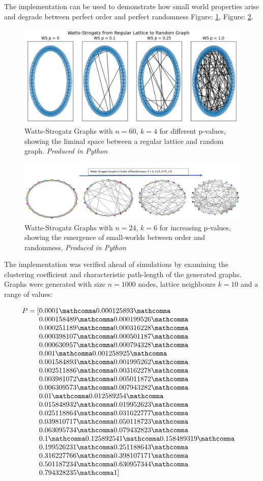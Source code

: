 \documentclass[
	a4paper, %
	10pt, %
	unnumberedsections, %
	twoside, %
]{LTJournalArticle}
\newcommand{\numberlist}[2][0.8\linewidth]{%
  [\parbox[t]{#1}{\printcommalist{#2}}%
}
\newcommand{\printcommalist}[1]{%
  \begingroup\lccode`~=`,\lowercase{\endgroup\def~}{\mathcomma\penalty0 }%
  \mathcode`,="8000
  \thinmuskip=6mu plus 6mu minus 2mu
  $#1]$
}
\begin{document}
The implementation can be used to demonstrate how small world properties arise and degrade between perfect order and perfect randomness Figure: \ref{fig:order_random}, Figure: \ref{fig:order_random_poster}. 

\begin{figure} %
	\includegraphics[width=\linewidth]{Figures/order_random.jpg}
	\caption{Watts-Strogatz Graphs with \(n = 60\), \(k = 4\) for different p-values, showing the liminal space between a regular lattice and random graph. \emph{Produced in Python}}
	\label{fig:order_random}
\end{figure}

\begin{figure} %
	\includegraphics[width=\linewidth]{Figures/order_random_poster.jpg}
	\caption{Watts-Strogatz Graphs with \(n = 24\), \(k = 6\) for increasing p-values, showing the emergence of small-worlds between order and randomness. \emph{Produced in Python}}
	\label{fig:order_random_poster}
\end{figure}

The implementation was verified ahead of simulations by examining the clustering coefficient and characteristic path-length of the generated graphs. Graphs were generated with size \(n = 1000 \) nodes, lattice neighbours \(k = 10\) and a range of values: 

\begin{align*}
P& = \numberlist{
	0.0001, 0.000125893, 0.000158489, 0.000199526, 0.000251189, 0.000316228, 0.000398107,0.000501187, 0.000630957, 0.000794328, 0.001, 0.001258925, 0.001584893, 0.001995262, 0.002511886, 0.003162278, 0.003981072, 0.005011872, 0.006309573, 0.007943282, 0.01, 0.012589254, 0.015848932, 0.019952623, 0.025118864, 0.031622777, 0.039810717, 0.050118723, 0.063095734, 0.079432823, 0.1, 0.125892541, 0.158489319, 0.199526231, 0.251188643, 
0.316227766, 0.398107171, 0.501187234, 0.630957344, 0.794328235, 1} \label{data:pvalues}
\end{align*} 
\end{document}
